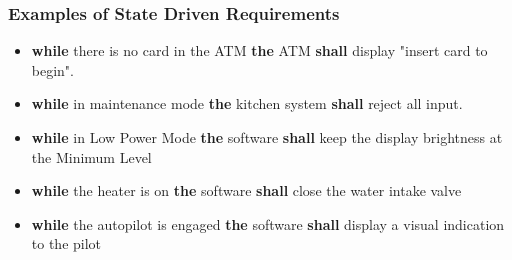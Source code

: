 \documentclass[aspectratio=169]{beamer}
\newcommand{\earss}[3]{{\bf \color{mygreen}while} {#1} {\bf \color{mypurple}the} {#2} {\bf \color{mypurple}shall} {#3}}
\begin{document}
%
\begin{frame}
  \frametitle{Examples of State Driven Requirements}
  \begin{example}
  \begin{itemize}
    \item \earss{there is no card in the ATM}{ATM}{display "insert card to begin"}.
    \item \earss{in maintenance mode}{kitchen system}{reject all input}.
    \item \earss{in Low Power Mode}{software}{keep the display brightness at the Minimum Level}
    \item \earss{the heater is on}{software}{close the water intake valve}
    \item \earss{the autopilot is engaged}{software}{display a visual indication to the pilot}
  \end{itemize}
 \end{example}
\end{frame}
%
%
%
\end{document}

